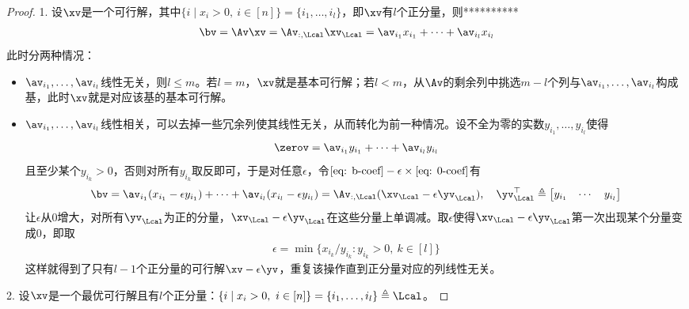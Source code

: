 \documentclass{ctexart}
\begin{document}
\begin{proof}
    1. 设$\xv$是一个可行解，其中$\{ i \mid x_i > 0, ~ i \in [n] \} = \{ i_1, \ldots, i_l \}$，即$\xv$有$l$个正分量，则**********
    \begin{align} \label{eq: b-coef}
        \bv = \Av \xv = \Av_{:, \Lcal} \xv_\Lcal = \av_{i_1} x_{i_1} + \cdots + \av_{i_l} x_{i_l}
    \end{align}
    此时分两种情况：
    \begin{itemize}
        \item $\av_{i_1}, \ldots, \av_{i_l}$线性无关，则$l \le m$。若$l = m$，$\xv$就是基本可行解；若$l < m$，从$\Av$的剩余列中挑选$m-l$个列与$\av_{i_1}, \ldots, \av_{i_l}$构成基，此时$\xv$就是对应该基的基本可行解。
        \item $\av_{i_1}, \ldots, \av_{i_l}$线性相关，可以去掉一些冗余列使其线性无关，从而转化为前一种情况。设不全为零的实数$y_{i_1}, \ldots, y_{i_l}$使得
              \begin{align} \label{eq: 0-coef}
                  \zerov = \av_{i_1} y_{i_1} + \cdots + \av_{i_l} y_{i_l}
              \end{align}
              且至少某个$y_{i_k} > 0$，否则对所有$y_{i_k}$取反即可，于是对任意$\epsilon$，令$\eqref{eq: b-coef} - \epsilon \times \eqref{eq: 0-coef}$有
              \begin{align*}
                  \bv = \av_{i_1} (x_{i_1} - \epsilon y_{i_1}) + \cdots + \av_{i_l} (x_{i_l} - \epsilon y_{i_l}) = \Av_{:, \Lcal} (\xv_\Lcal - \epsilon \yv_\Lcal), \quad
                  \yv_\Lcal^\top \triangleq \begin{bmatrix}
                                                y_{i_1} & \cdots & y_{i_l}
                                            \end{bmatrix}
              \end{align*}
              让$\epsilon$从$0$增大，对所有$\yv_\Lcal$为正的分量，$\xv_\Lcal - \epsilon \yv_\Lcal$在这些分量上单调减。取$\epsilon$使得$\xv_\Lcal - \epsilon \yv_\Lcal$第一次出现某个分量变成$0$，即取
              \begin{align*}
                  \epsilon = \min \{ x_{i_k} / y_{i_k} : y_{i_k} > 0, ~ k \in [l] \}
              \end{align*}
              这样就得到了只有$l-1$个正分量的可行解$\xv - \epsilon \yv$，重复该操作直到正分量对应的列线性无关。
    \end{itemize}

    2. 设$\xv$是一个最优可行解且有$l$个正分量：$\{ i \mid x_i > 0, ~ i \in [n] \} = \{ i_1, \ldots, i_l \} \triangleq \Lcal$。


\end{proof}
\end{document}
